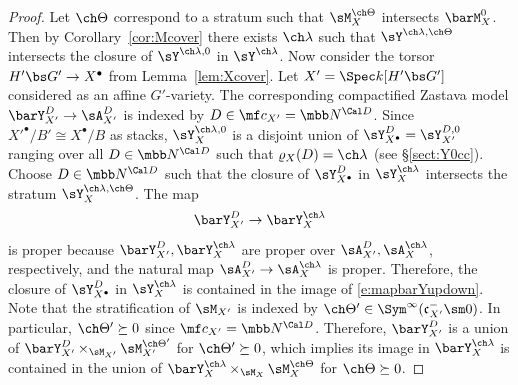 \documentclass[final]{amsart}
\theoremstyle{remark}
\theoremstyle{definition}
\DeclareMathOperator*{\xt}{\times}
\numberwithin{equation}{section}
\begin{document}
\begin{proof}
Let $\ch\Theta$ correspond to a stratum such that 
$\sM_X^{\ch\Theta}$ intersects $\barM_X^0$. Then by
Corollary~\ref{cor:Mcover} there exists $\ch\lambda$ 
such that $\sY^{\ch\lambda,\ch\Theta}$ intersects the closure
of $\sY^{\ch\lambda,0}$ in $\sY^{\ch\lambda}$. 
Now consider the torsor $H'\bs G' \to X^\bullet$ from 
Lemma~\ref{lem:Xcover}. 
Let $X' = \Spec k[H'\bs G']$ considered as an affine $G'$-variety.
The corresponding compactified Zastava model 
$\barY^{D}_{X'} \to \sA^{D}_{X'}$ is indexed
by $D\in \mf c_{X'}=\mbb N^{\Cal D}$. 
Since $X'^\bullet/B' \cong X^\bullet/B$ as stacks, 
$\sY^{\ch\lambda,0}_X$ is a disjoint union of $\sY^D_{X^\bullet}=\sY^{D,0}_{X'}$
ranging over all $D\in \mbb N^{\Cal D}$ such that $\varrho_X(D)=\ch\lambda$
(see \S\ref{sect:Y0cc}). 
Choose $D\in \mbb N^{\Cal D}$ such that the closure of 
$\sY^D_{X^\bullet}$ in $\sY^{\ch\lambda}_X$ intersects 
the stratum $\sY^{\ch\lambda,\ch\Theta}_X$. 
The map 
\begin{equation} \label{e:mapbarYupdown}
 \barY^{D}_{X'} \to \barY^{\ch\lambda}_X  
\end{equation}
is proper because $\barY^{D}_{X'}, \barY^{\ch\lambda}_X$
are proper over $\sA^{D}_{X'},\sA^{\ch\lambda}_X$, respectively,
and the natural map $\sA^{D}_{X'}\to \sA^{\ch\lambda}_X$ 
is proper. Therefore, the closure of $\sY^{D}_{X^\bullet}$
in $\sY^{\ch\lambda}_X$ is contained in the image
of \eqref{e:mapbarYupdown}.
Note that the stratification of $\sM_{X'}$ is indexed by 
$\ch\Theta' \in \Sym^\infty(\mathfrak c_{X'}^-\sm 0)$. 
In particular, $\ch\Theta' \succeq 0$ since $\mf c_{X'}=\mbb N^{\Cal D}$. 
Therefore, $\barY^{D}_{X'}$ is a union of 
$\barY^{D}_{X'} \xt_{\sM_{X'}} \sM_{X'}^{\ch\Theta'}$
for $\ch\Theta' \succeq 0$, which implies its image in 
$\barY^{\ch\lambda}_X$ is contained in the union 
of $\barY^{\ch\lambda}_X \xt_{\sM_X} \sM_X^{\ch\Theta}$
for $\ch\Theta \succeq 0$.
\end{proof}
\end{document}

